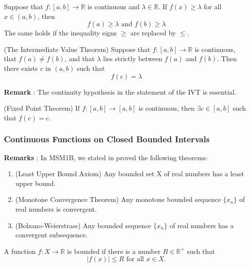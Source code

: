 \documentclass[12pt]{article}
\begin{document}
			\begin{lemma}
				Suppose that $f : [a,b] \to \mathbb{R}$ is continuous and $\lambda \in \mathbb{R}$. If $f(x) \geq 							\lambda$ for all $x \in (a,b)$, then
					\[
						f(a) \geq \lambda \mbox{   and   } f(b) \geq \lambda
					\]
				The same holds if the inequality signs $\geq$ are replaced by $\leq$.
			\end{lemma}

			\begin{thm}
				(The Intermediate Value Theorem) Suppose that $f : [a,b] \to \mathbb{R}$ is continuous, that $f(a) 					\neq f(b)$, and that $\lambda$ lies strictly between $f(a)$ and $f(b)$. Then there exists 							$c$ in $(a,b)$ such that
					\[
						f(c) = \lambda
					\]
			\end{thm}

			{\bf{Remark}} : The continuity hypothesis in the statement of the IVT is essential.

			\begin{thm}
				(Fixed Point Theorem) If $f : [a,b] \to [a,b]$ is continuous, then $\exists c \in [a,b]$ such that $f(c) 					= c$.
			\end{thm}

		\subsubsection{Continuous Functions on Closed Bounded Intervals}
			
			{\bf{Remarks}} : In MSM1B, we stated in proved the following theorems:
				\begin{enumerate}
					\item
						\begin{thm}
							(Least Upper Bound Axiom) Any bounded set X of real numbers has a least 									upper bound.
						\end{thm}
					\item
						\begin{thm}
							(Monotone Convergence Theorem) Any monotone bounded sequence 										$\{x_n\}$ of real numbers is convergent.
						\end{thm}
					\item
						\begin{thm}
							(Bolzano-Weierstrass) Any bounded sequence $\{x_n\}$ of real numbers has 								 a convergent subsequence.
						\end{thm}
				\end{enumerate}

			\begin{defn}
				A function $f : X \to \mathbb{R}$ is bounded if there is a number $R \in \mathbb{R}^+$ such that
					\[
						|f(x)| \leq R \mbox{   for all   } x \in X.
					\]
			\end{defn}
\end{document}
